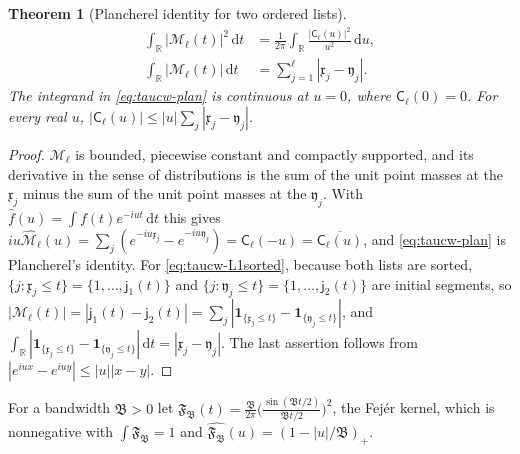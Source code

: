 \documentclass[11pt,a4paper]{article}
\numberwithin{equation}{section}
\newtheorem{theorem}{Theorem}[section]
\theoremstyle{definition}
\theoremstyle{remark}
\newcommand{\ind}{\mathbf 1}
\newcommand{\dd}{\,\mathrm dt}
\begin{document}
\begin{theorem}[Plancherel identity for two ordered lists]\label{thm:taucw-plan}
\begin{align}
\int_{\mathbb R}|\mathscr M_\ell(t)|^2\dd&=\frac1{2\pi}\int_{\mathbb R}\frac{|\mathsf C_\ell(u)|^2}{u^2}\,\mathrm du,\label{eq:taucw-plan}\\
\int_{\mathbb R}|\mathscr M_\ell(t)|\dd&=\sum_{j=1}^\ell|\mathfrak x_j-\mathfrak y_j|.\label{eq:taucw-L1sorted}
\end{align}
The integrand in \eqref{eq:taucw-plan} is continuous at $u=0$, where $\mathsf C_\ell(0)=0$. For every real $u$, $|\mathsf C_\ell(u)|\le|u|\sum_j|\mathfrak x_j-\mathfrak y_j|$.
\end{theorem}
\begin{proof}
$\mathscr M_\ell$ is bounded, piecewise constant and compactly supported, and its derivative in the sense of distributions is the sum of the unit point masses at the $\mathfrak x_j$ minus the sum of the unit point masses at the $\mathfrak y_j$. With $\widehat f(u)=\int f(t)e^{-iut}\dd$ this gives $iu\widehat{\mathscr M_\ell}(u)=\sum_j(e^{-iu\mathfrak x_j}-e^{-iu\mathfrak y_j})=\mathsf C_\ell(-u)=\overline{\mathsf C_\ell(u)}$, and \eqref{eq:taucw-plan} is Plancherel's identity. For \eqref{eq:taucw-L1sorted}, because both lists are sorted, $\{j:\mathfrak x_j\le t\}=\{1,\dots,\mathsf j_1(t)\}$ and $\{j:\mathfrak y_j\le t\}=\{1,\dots,\mathsf j_2(t)\}$ are initial segments, so $|\mathscr M_\ell(t)|=|\mathsf j_1(t)-\mathsf j_2(t)|=\sum_j|\ind_{\{\mathfrak x_j\le t\}}-\ind_{\{\mathfrak y_j\le t\}}|$, and $\int_{\mathbb R}|\ind_{\{\mathfrak x_j\le t\}}-\ind_{\{\mathfrak y_j\le t\}}|\dd=|\mathfrak x_j-\mathfrak y_j|$. The last assertion follows from $|e^{iux}-e^{iuy}|\le|u||x-y|$.
\end{proof}

For a bandwidth $\mathfrak B>0$ let $\mathfrak F_{\mathfrak B}(t)=\frac{\mathfrak B}{2\pi}\bigl(\frac{\sin(\mathfrak Bt/2)}{\mathfrak Bt/2}\bigr)^2$, the Fej\'er kernel, which is nonnegative with $\int\mathfrak F_{\mathfrak B}=1$ and $\widehat{\mathfrak F_{\mathfrak B}}(u)=(1-|u|/\mathfrak B)_+$.
\end{document}
